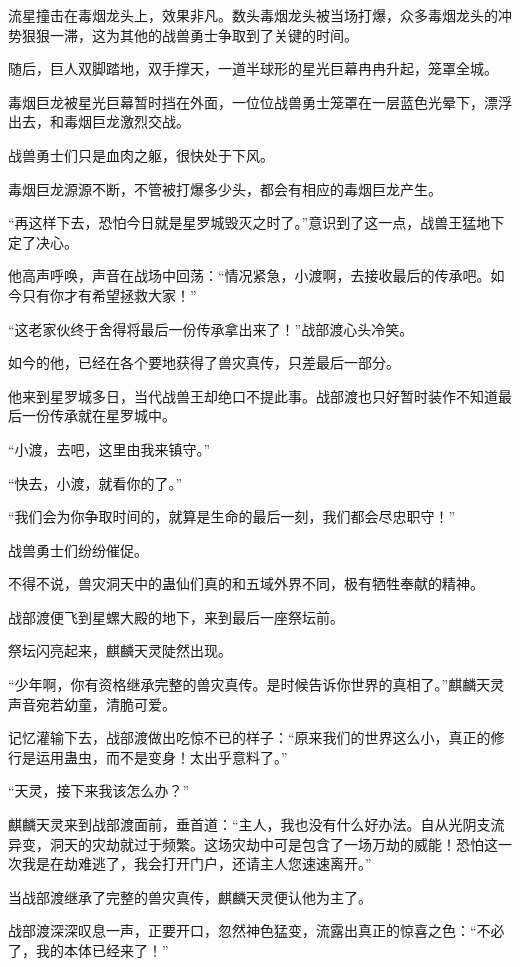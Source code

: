 \begin{this_body}
流星撞击在毒烟龙头上，效果非凡。数头毒烟龙头被当场打爆，众多毒烟龙头的冲势狠狠一滞，这为其他的战兽勇士争取到了关键的时间。

随后，巨人双脚踏地，双手撑天，一道半球形的星光巨幕冉冉升起，笼罩全城。

毒烟巨龙被星光巨幕暂时挡在外面，一位位战兽勇士笼罩在一层蓝色光晕下，漂浮出去，和毒烟巨龙激烈交战。

战兽勇士们只是血肉之躯，很快处于下风。

毒烟巨龙源源不断，不管被打爆多少头，都会有相应的毒烟巨龙产生。

“再这样下去，恐怕今日就是星罗城毁灭之时了。”意识到了这一点，战兽王猛地下定了决心。

他高声呼唤，声音在战场中回荡：“情况紧急，小渡啊，去接收最后的传承吧。如今只有你才有希望拯救大家！”

“这老家伙终于舍得将最后一份传承拿出来了！”战部渡心头冷笑。

如今的他，已经在各个要地获得了兽灾真传，只差最后一部分。

他来到星罗城多日，当代战兽王却绝口不提此事。战部渡也只好暂时装作不知道最后一份传承就在星罗城中。

“小渡，去吧，这里由我来镇守。”

“快去，小渡，就看你的了。”

“我们会为你争取时间的，就算是生命的最后一刻，我们都会尽忠职守！”

战兽勇士们纷纷催促。

不得不说，兽灾洞天中的蛊仙们真的和五域外界不同，极有牺牲奉献的精神。

战部渡便飞到星螺大殿的地下，来到最后一座祭坛前。

祭坛闪亮起来，麒麟天灵陡然出现。

“少年啊，你有资格继承完整的兽灾真传。是时候告诉你世界的真相了。”麒麟天灵声音宛若幼童，清脆可爱。

记忆灌输下去，战部渡做出吃惊不已的样子：“原来我们的世界这么小，真正的修行是运用蛊虫，而不是变身！太出乎意料了。”

“天灵，接下来我该怎么办？”

麒麟天灵来到战部渡面前，垂首道：“主人，我也没有什么好办法。自从光阴支流异变，洞天的灾劫就过于频繁。这场灾劫中可是包含了一场万劫的威能！恐怕这一次我是在劫难逃了，我会打开门户，还请主人您速速离开。”

当战部渡继承了完整的兽灾真传，麒麟天灵便认他为主了。

战部渡深深叹息一声，正要开口，忽然神色猛变，流露出真正的惊喜之色：“不必了，我的本体已经来了！”


\end{this_body}
